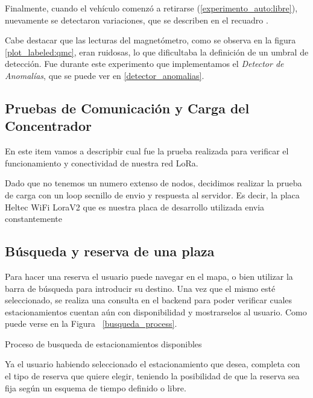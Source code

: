 Finalmente, cuando el vehículo comenzó a retirarse (\ref{experimento_auto:libre}), nuevamente se detectaron variaciones, que se describen en el recuadro .

Cabe destacar que las lecturas del magnetómetro, como se observa en la figura \ref{plot_labeled:qmc}, eran ruidosas, lo que dificultaba la definición de un umbral de detección. Fue durante este experimento que implementamos el \textit{Detector de Anomalías}, que se puede ver en \ref{detector_anomalias}.


\subsection{Pruebas de Comunicación y Carga del Concentrador}\label{title:cx_load_concentrador}

En este item vamos a descripbir cual fue la prueba realizada para verificar el funcionamiento y conectividad de nuestra red LoRa.

Dado que no tenemos un numero extenso de nodos, decidimos realizar la prueba de carga con un loop secnillo de envio y respuesta al servidor. Es decir, la placa Heltec WiFi LoraV2 que es nuestra placa de desarrollo utilizada envia constantemente



\subsection{Búsqueda y reserva de una plaza}
Para hacer una reserva el usuario puede navegar en el mapa, o bien utilizar la barra de búsqueda para introducir su destino. Una vez que el mismo esté seleccionado, se realiza una consulta en el backend para poder verificar cuales estacionamientos cuentan aún con disponibilidad y mostrarselos al usuario. Como puede verse en la Figura ~\ref{busqueda_process}.

\begin{images}[\label{busqueda_process}]{Proceso de busqueda de estacionamientos disponibles}
\end{images}

Ya el usuario habiendo seleccionado el estacionamiento que desea, completa con el tipo de reserva que quiere elegir, teniendo la posibilidad de que la reserva sea fija según un esquema de tiempo definido o libre.

